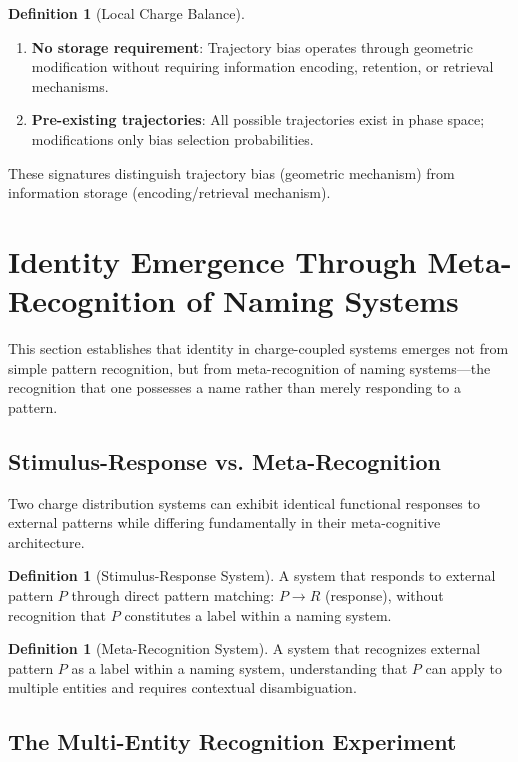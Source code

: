 \documentclass[12pt,a4paper]{article}
\theoremstyle{plain}
\theoremstyle{definition}
\newtheorem{definition}[theorem]{Definition}
\theoremstyle{remark}
\begin{document}
\begin{definition}[Local Charge Balance]
\begin{enumerate}
\item \textbf{No storage requirement}: Trajectory bias operates through geometric modification without requiring information encoding, retention, or retrieval mechanisms.

\item \textbf{Pre-existing trajectories}: All possible trajectories exist in phase space; modifications only bias selection probabilities.
\end{enumerate}

These signatures distinguish trajectory bias (geometric mechanism) from information storage (encoding/retrieval mechanism).
\section{Identity Emergence Through Meta-Recognition of Naming Systems}
\label{sec:identity_emergence}

This section establishes that identity in charge-coupled systems emerges not from simple pattern recognition, but from meta-recognition of naming systems—the recognition that one possesses a name rather than merely responding to a pattern.

\subsection{Stimulus-Response vs. Meta-Recognition}

Two charge distribution systems can exhibit identical functional responses to external patterns while differing fundamentally in their meta-cognitive architecture.

\begin{definition}[Stimulus-Response System]
A system that responds to external pattern $P$ through direct pattern matching: $P \rightarrow R$ (response), without recognition that $P$ constitutes a label within a naming system.
\end{definition}

\begin{definition}[Meta-Recognition System]
A system that recognizes external pattern $P$ as a label within a naming system, understanding that $P$ can apply to multiple entities and requires contextual disambiguation.
\end{definition}

\subsection{The Multi-Entity Recognition Experiment}


\end{definition}
\end{document}
